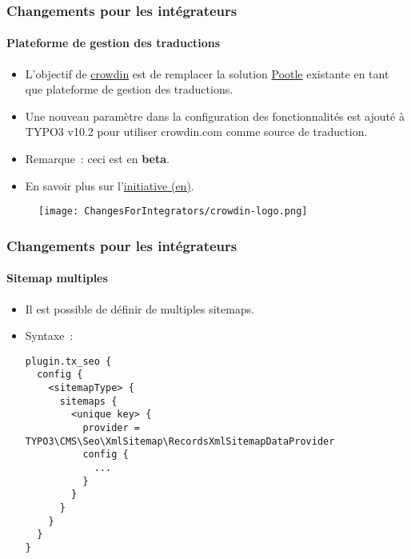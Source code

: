 
\begin{frame}[fragile]
	\frametitle{Changements pour les intégrateurs}
	\framesubtitle{Plateforme de gestion des traductions}

	\begin{itemize}

		\item L'objectif de \href{https://crowdin.com/}{crowdin} est de remplacer la solution
			\href{https://translation.typo3.org/}{Pootle} existante
			en tant que plateforme de gestion des traductions.

		\item Une nouveau paramètre dans la configuration des fonctionnalités est ajouté à TYPO3 v10.2 pour utiliser crowdin.com
			comme source de traduction.

		\item Remarque~: ceci est en \textbf{beta}.

		\item En savoir plus sur
			l'\href{https://typo3.org/community/teams/typo3-development/initiatives/localization-with-crowdin/}{initiative (en)}.

	\end{itemize}

	\begin{figure}
		\texttt{[image: ChangesForIntegrators/crowdin-logo.png]}
	\end{figure}

\end{frame}


\begin{frame}[fragile]
	\frametitle{Changements pour les intégrateurs}
	\framesubtitle{Sitemap multiples}

	\lstset{basicstyle=\tiny\ttfamily}

	\begin{itemize}

		\item Il est possible de définir de multiples sitemaps.
		\item Syntaxe~:
\begin{lstlisting}
plugin.tx_seo {
  config {
    <sitemapType> {
      sitemaps {
        <unique key> {
          provider = TYPO3\CMS\Seo\XmlSitemap\RecordsXmlSitemapDataProvider
          config {
            ...
          }
        }
      }
    }
  }
}
\end{lstlisting}

	\end{itemize}

\end{frame}


